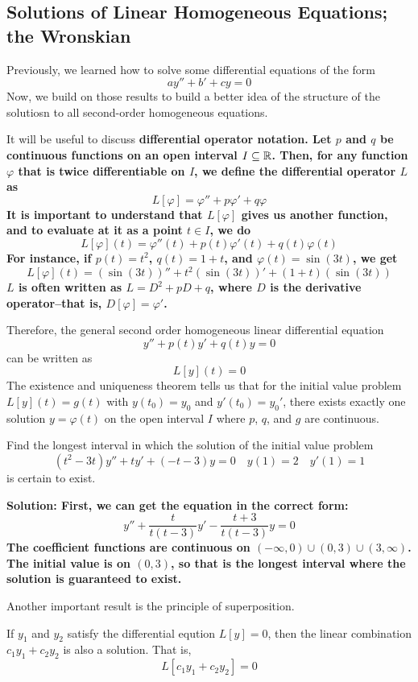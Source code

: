 \subsection{Solutions of Linear Homogeneous Equations; the Wronskian}
Previously, we learned how to solve some differential equations of the form
\[ ay'' + b' + cy = 0\]
Now, we build on those results to build a better idea of the structure of the solutiosn to all second-order homogeneous equations. \par
It will be useful to discuss \bf{differential operator} notation. Let $p$ and $q$ be continuous functions on an open interval $I\subseteq \mathbb{R}$. Then, for any function $\varphi$ that is twice differentiable on $I$, we define the differential operator $L$ as
\[ L[\varphi] = \varphi'' + p\varphi' + q\varphi \]
It is important to understand that $L[\varphi]$ gives us another function, and to evaluate at it as a point $t\in I$, we do
\[ L[\varphi](t) = \varphi''(t) + p(t)\varphi'(t) + q(t)\varphi(t) \]
For instance, if $p(t) = t^2$, $q(t) = 1+t$, and $\varphi(t) = \sin(3t)$, we get
\[ L[\varphi](t) = (\sin(3t))'' + t^2(\sin(3t))' + (1+t)(\sin(3t))\]
$L$ is often written as $L = D^2 + pD + q$, where $D$ is the derivative operator--that is, $D[\varphi] = \varphi'$. \par
Therefore, the general second order homogeneous linear differential equation 
\[ y'' + p(t)y' + q(t)y = 0\] 
can be written as
\[ L[y](t) = 0\]
The existence and uniqueness theorem tells us that for the initial value problem $L[y](t) = g(t)$ with $y(t_0) = y_0$ and $y'(t_0) = y_0'$, there exists exactly one solution $y=\varphi(t)$ on the open interval $I$ where $p$, $q$, and $g$ are continuous.
\begin{example}
    Find the longest interval in which the solution of the initial value problem
    \[ (t^2-3t)y'' + ty' + (-t - 3)y = 0 \quad y(1) = 2 \quad y'(1) = 1 \]
    is certain to exist. \par
    \bf{Solution:} First, we can get the equation in the correct form:
    \[ y'' + \frac{t}{t(t-3)}y' - \frac{t + 3}{t(t-3)}y = 0\]
    The coefficient functions are continuous on $(-\infty, 0)\cup(0, 3)\cup(3, \infty)$. The initial value is on $(0,3)$, so that is the longest interval where the solution is guaranteed to exist.
\end{example}
Another important result is the principle of superposition.
\begin{theorem}
    If $y_1$ and $y_2$ satisfy the differential eqution $L[y] = 0$, then the linear combination $c_1y_1 + c_2y_2$ is also a solution. That is,
    \[ L[c_1y_1 + c_2y_2] = 0 \]
\end{theorem}
